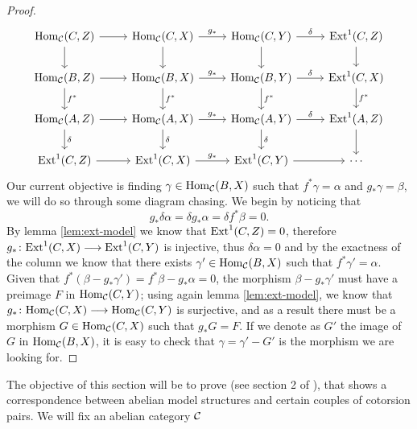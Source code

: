\begin{proof}
	\[\begin{tikzcd}
		{\Hom_\C(C,Z)} & {\Hom_\C(C,X)} & {\Hom_\C(C,Y)} & {\Ext^1(C,Z)} \\
		{\Hom_\C(B,Z)} & {\Hom_\C(B,X)} & {\Hom_\C(B,Y)} & {\Ext^1(C,X)} \\
		{\Hom_\C(A,Z)} & {\Hom_\C(A,X)} & {\Hom_\C(A,Y)} & {\Ext^1(A,Z)} \\
		{\Ext^1(C,Z)} & {\Ext^1(C,X)} & {\Ext^1(C,Y)} & \cdots
		\arrow[from=1-1, to=1-2]
		\arrow[from=1-1, to=2-1]
		\arrow["{g_*}", from=1-2, to=1-3]
		\arrow[from=1-2, to=2-2]
		\arrow["\delta", from=1-3, to=1-4]
		\arrow[from=1-3, to=2-3]
		\arrow[from=1-4, to=2-4]
		\arrow[from=2-1, to=2-2]
		\arrow["{f^*}", from=2-1, to=3-1]
		\arrow["{g_*}", from=2-2, to=2-3]
		\arrow["{f^*}", from=2-2, to=3-2]
		\arrow["\delta", from=2-3, to=2-4]
		\arrow["{f^*}", from=2-3, to=3-3]
		\arrow["{f^*}", from=2-4, to=3-4]
		\arrow[from=3-1, to=3-2]
		\arrow["\delta", from=3-1, to=4-1]
		\arrow["{g_*}", from=3-2, to=3-3]
		\arrow["\delta", from=3-2, to=4-2]
		\arrow["\delta", from=3-3, to=3-4]
		\arrow["\delta", from=3-3, to=4-3]
		\arrow[from=3-4, to=4-4]
		\arrow[from=4-1, to=4-2]
		\arrow["{g_*}", from=4-2, to=4-3]
		\arrow[from=4-3, to=4-4]
	\end{tikzcd}\]
	Our current objective is finding $\gamma\in \mathrm{Hom}_{\mathcal{C}}(B,X)$ such that $f^* \gamma = \alpha$ and $g_* \gamma = \beta$, we will do so through some diagram chasing. We begin by noticing that \[g_*\delta \alpha = \delta g_* \alpha = \delta f^* \beta = 0. \] By lemma \ref{lem:ext-model} we know that ${\mathrm{Ext}^1(C,Z)} = 0$, therefore $g_* \colon{\mathrm{Ext}^1(C,X)} \longrightarrow {\mathrm{Ext}^1(C,Y)}$ is injective, thus $\delta \alpha = 0$ and by the exactness of the column we know that there exists $\gamma'\in \mathrm{Hom}_{\mathcal{C}}(B,X)$ such that $f^* \gamma' = \alpha$. Given that $f^*(\beta - g_*\gamma')= f^*\beta -g_* \alpha = 0$, the morphism $\beta - g_*\gamma'$ must have a preimage $F$ in ${\mathrm{Hom}_{\mathcal{C}}(C,Y)}$; using again lemma \ref{lem:ext-model}, we know that $g_*\colon {\mathrm{Hom}_{\mathcal{C}}(C,X)} \longrightarrow  {\mathrm{Hom}_{\mathcal{C}}(C,Y)}$ is surjective, and as a result there must be a morphism $G\in {\mathrm{Hom}_{\mathcal{C}}(C,X)}$ such that $g_* G = F$. If we denote as $G'$ the image of $G$ in $\mathrm{Hom}_{\mathcal{C}}(B,X)$, it is easy to check that $\gamma = \gamma' - G'$ is the morphism we are looking for.

\end{proof}



The objective of this section will be to prove  (see section 2 of \cite{Hovey2002}), that shows a correspondence between abelian model structures and certain couples of cotorsion pairs. We will fix an abelian category $\mathcal{C}$ 

